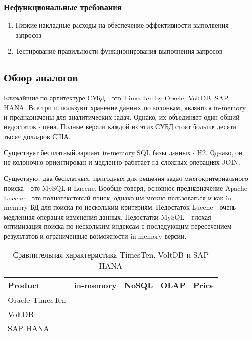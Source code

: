 \documentclass{matmex-diploma}
\begin{document}
        \subsubsection{Нефункциональные требования}
            \begin{enumerate} 
                    \item Низкие накладные расходы на обеспечение эффективности выполнения запросов
                    \item Тестирование правильности функционирования выполнения запросов
            \end{enumerate}
    \subsection{Обзор аналогов}
        Ближайшие по архитектуре СУБД - это TimesTen by Oracle, VoltDB, SAP HANA. Все три используют хранение данных по колонкам, являются in-memory и предназначены для аналитических задач. Однако, их объединяет один общий недостаток - цена. Полные версии каждой из этих СУБД стоят больше десяти тысяч долларов США.
    
    Существует бесплатный вариант in-memory SQL базы данных - H2. Однако, он не колоночно-ориентирован и медленно работает на сложных операциях JOIN.
    
    Существуют два бесплатных, пригодных для решения задач многокритериального поиска - это MySQL и Lucene. Вообще говоря, основное предназначение Apache Lucene - это полнотекстовый поиск, однако им можно пользоваться и как in-memory БД для поиска по нескольким критериям. Недостаток Lucene - очень медленная операция изменения данных. Недостатки MySQL - плохая оптимизация поиска по нескольким индексам с последующим пересечением результатов и ограниченные возможности in-memory версии. 
    
    \begin{table}[h]
        \centering
        \caption{Сравнительная характеристика TimesTen, VoltDB и SAP HANA}
        \begin{tabular}{| l | c | c | c | c |}
            \hline
            Product & in-memory & NoSQL & OLAP & Price \\
            \hline
            Oracle TimesTen & \color{green}{\checkmark} & \color{green}{\checkmark} & \color{green}{\checkmark} & \color{red}{€19,969.00} \\
            \hline 
            VoltDB          & \color{green}{\checkmark} & \color{green}{\checkmark} & \color{green}{\checkmark} & \color{red}{\$3500/month} \\
            \hline
            SAP HANA        & \color{green}{\checkmark} & \color{green}{\checkmark} & \color{green}{\checkmark} & \color{red}{\$3595/month}\\
            \hline
        \end{tabular}
    \end{table}
    
\end{document}
